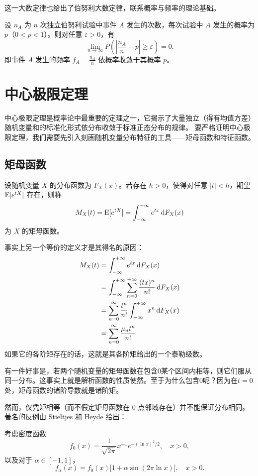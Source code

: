这一大数定律也给出了伯努利大数定律，联系概率与频率的理论基础。
\begin{theorem}[伯努利大数定律]
设 $n_A$ 为 $n$ 次独立伯努利试验中事件 $A$ 发生的次数，每次试验中 $A$ 发生的概率为 $p$（$0 < p < 1$）。则对任意 $\varepsilon > 0$，有
\[
\lim_{n \to \infty} P\left( \left| \frac{n_A}{n} - p \right| \ge \varepsilon \right) = 0.
\]
即事件 $A$ 发生的频率 $f_A=\frac{n_A}{n}$ 依概率收敛于其概率 $p$。
\end{theorem}

\section{中心极限定理}
中心极限定理是概率论中最重要的定理之一，它揭示了大量独立（得有均值方差）随机变量和的标准化形式依分布收敛于标准正态分布的规律。
要严格证明中心极限定理，我们需要先引入刻画随机变量分布特征的工具——矩母函数和特征函数。

\subsection{矩母函数}
设随机变量 $X$ 的分布函数为 $F_X(x)$。若存在 $h > 0$，使得对任意 $|t| < h$，期望 $\operatorname{E}[e^{tX}]$ 存在，则称
\[
M_X(t) = \operatorname{E}[e^{tX}] = \int_{-\infty}^{+\infty} e^{tx} \mathop{}\!\mathrm{d} F_X(x)
\]
为 $X$ 的矩母函数。

事实上另一个等价的定义才是其得名的原因：
\begin{align*}
M_X(t)&=\int_{-\infty}^{+\infty} e^{tx} \mathop{}\!\mathrm{d} F_X(x)\\
&=\int_{-\infty}^{+\infty} \sum_{n=0}^{+\infty}\frac{(tx)^n}{n!} \mathop{}\!\mathrm{d} F_X(x)\\
&=\sum_{n=0}^{\infty}\frac{t^n}{n!}\int_{-\infty}^{+\infty}x^n \mathop{}\!\mathrm{d} F_X(x)\\
&=\sum_{n=0}^{\infty}\frac{\mu_nt^n}{n!}
\end{align*}
如果它的各阶矩存在的话，这就是其各阶矩给出的一个泰勒级数。

有一件好事是，若两个随机变量的矩母函数在包含$0$某个区间内相等，则它们服从同一分布。这事实上就是解析函数的性质使然。至于为什么包含$0$呢？因为在$t=0$处，矩母函数的诸阶导数就是诸阶矩。

然而，仅凭矩相等（而不假定矩母函数在 $0$ 点邻域存在）并不能保证分布相同。著名的反例由 Stieltjes 和 Heyde 给出：

考虑密度函数
\[
f_0(x) = \frac{1}{\sqrt{2\pi}} x^{-1} e^{-(\ln x)^2/2}, \quad x > 0,
\]
以及对于 $\alpha \in [-1, 1]$，
\[
f_\alpha(x) = f_0(x) \bigl[1 + \alpha \sin(2\pi \ln x) \bigr], \quad x > 0.
\]

